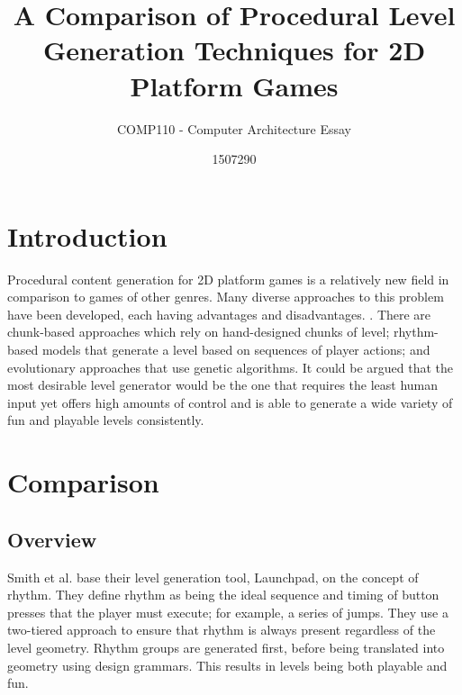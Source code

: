 \documentclass{scrartcl}
\title{A Comparison of Procedural Level Generation Techniques for 2D Platform Games}
\subtitle{COMP110 - Computer Architecture Essay}
\author{1507290}
\begin{document}
\maketitle


\section{Introduction}
Procedural content generation for 2D platform games is a relatively new field in comparison to games of other genres\cite{compton:platform}. Many diverse approaches to this problem have been developed, each having advantages and disadvantages. \cite{Find Gillian Smiths comparison paper}. There are chunk-based approaches which rely on hand-designed chunks of level; rhythm-based models that generate a level based on sequences of player actions; and evolutionary approaches that use genetic algorithms. It could be argued that the most desirable level generator would be the one that requires the least human input yet offers high amounts of control and is able to generate a wide variety of fun and playable levels consistently. 
 


\section{Comparison}

\subsection{Overview}
Smith et al.\cite{smith:launchpad} base their level generation tool, Launchpad, on the concept of rhythm. They define rhythm as being the ideal sequence and timing of button presses that the player must execute; for example, a series of jumps. They use a two-tiered approach to ensure that rhythm is always present regardless of the level geometry. Rhythm groups are generated first, before being translated into geometry using design grammars. This results in levels being both playable and fun. 
\end{document}
